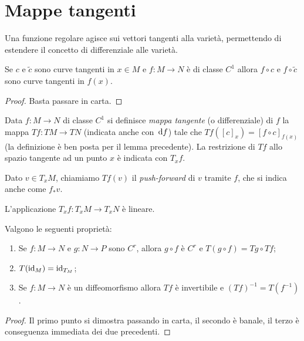 \section{Mappe tangenti}
Una funzione regolare agisce sui vettori tangenti alla varietà, permettendo di estendere il concetto di differenziale alle varietà.
 
\begin{lemma}
	Se $c$ e $\tilde{c}$ sono curve tangenti in $x\in M$ e $f:M\to N$ è di classe $C^1$ allora $f\circ c$ e $f\circ\tilde{c}$ sono curve tangenti in $f(x)$.
\end{lemma}

 \begin{proof}
  Basta passare in carta.
 \end{proof}

\begin{definition} 
	Data $f:M\to N$ di classe $C^1$ si definisce \emph{mappa tangente} (o differenziale) di $f$ la mappa $Tf:TM\to TN$ (indicata anche con $\,\mathrm d f$) tale che $Tf([c]_x)=[f\circ c]_{f(x)}$ (la definizione è ben posta per il lemma precedente).
	La restrizione di $Tf$ allo spazio tangente ad un punto $x$ è indicata con $T_xf$.
\end{definition}

\begin{remark}
	Dato $v\in T_xM$, chiamiamo $Tf(v)$ il \emph{push-forward} di $v$ tramite $f$, che si indica anche come $f_*v$. 
\end{remark}


\begin{remark}
	L'applicazione $T_xf:T_xM\to T_xN$ è lineare.
\end{remark}
 
\begin{theorem} \label{thm:MappeComposte} 
	Valgono le seguenti proprietà:
	\begin{enumerate}
	\item Se $f:M\to N$ e $g:N\to P$ sono $C^r$, allora $g\circ f$ è $C^r$ e $T(g\circ f)=Tg\circ Tf$;
	\item $T(\mathrm{id}_M)=\mathrm{id}_{T_M}$;
	\item Se $f:M\to N$ è un diffeomorfismo allora $Tf$ è invertibile e $(Tf)^{-1}=T(f^{-1})$.
	\end{enumerate}
\end{theorem}

\begin{proof}
	Il primo punto si dimostra passando in carta, il secondo è banale, il terzo è conseguenza immediata dei due precedenti.
\end{proof}

